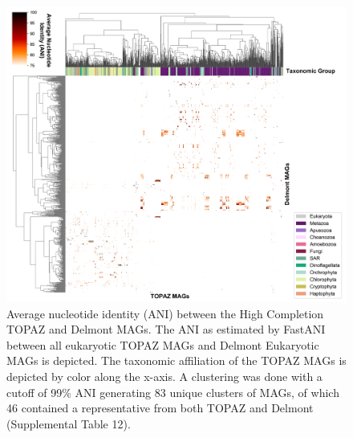 \documentclass[12pt]{article}
\numberwithin{equation}{section}
\begin{document}
\begin{figure}
    \centering
    \includegraphics[width=0.95\columnwidth]{si-figures/Alexander_Delmont_clustermap-01.png}
    \caption{Average nucleotide identity (ANI) between the High Completion TOPAZ and Delmont MAGs. The ANI as estimated by FastANI between all eukaryotic TOPAZ MAGs and Delmont Eukaryotic MAGs is depicted. The taxonomic affiliation of the TOPAZ MAGs is depicted by color along the x-axis. A clustering was done with a cutoff of 99\% ANI generating 83 unique clusters of MAGs, of which 46 contained a representative from both TOPAZ and Delmont (Supplemental Table 12). }
        \label{fig:delmontfani}
\end{figure}
\end{document}
